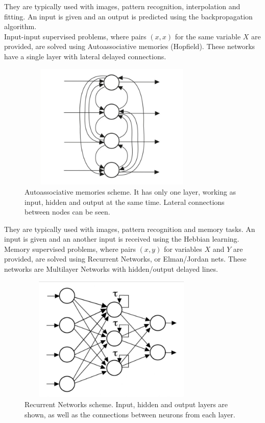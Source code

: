 They are typically used with images, pattern recognition, interpolation and fitting. An input is given and an output is predicted using the backpropagation algorithm.\\

Input-input supervised problems, where pairs $(x,x)$ for the same variable $X$ are provided, are solved using Autoassociative memories (Hopfield). These networks have a single layer with lateral delayed connections.

\begin{figure}[h!]
  \begin{center}
    \includegraphics[width=90mm, height=60mm]{Figuras/AutoassociativeNN.png}\par
    \caption{Autoassociative memories scheme. It has only one layer, working as input, hidden and output at the same time. Lateral connections between nodes can be seen.}
    \label{fig:AutoassociativeNN}
  \end{center}
\end{figure}

They are typically used with images, pattern recognition and memory tasks. An input is given and an another input is received using the Hebbian learning.\\

Memory supervised problems, where pairs $(x,y)$ for variables $X$ and $Y$ are provided, are solved using Recurrent Networks, or Elman/Jordan nets. These networks are Multilayer Networks with hidden/output delayed lines.\vspace{5cm}

\begin{figure}[h!]
  \begin{center}
    \includegraphics[width=90mm, height=60mm]{Figuras/RecurrentNN.png}\par
    \caption{Recurrent Networks scheme. Input, hidden and output layers are shown, as well as the connections between neurons from each layer.}
    \label{fig:RecurrentNN}
  \end{center}
\end{figure}


